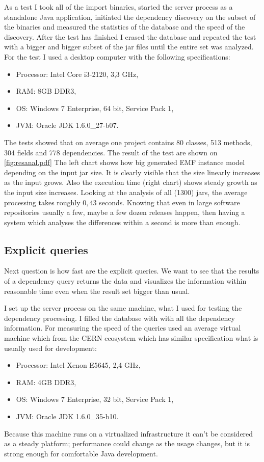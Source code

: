 As a test I took all of the import binaries, started the server process as a
standalone Java application, initiated the dependency discovery on the subset of
the binaries and measured the statistics of the database and the speed of the
discovery. After the test has finished I erased the database and repeated the
test with a bigger and bigger subset of the jar files until the entire set was
analyzed. For the test I used a desktop computer with the following
specifications:
\begin{itemize}
  \item Processor: Intel Core i3-2120, 3,3 GHz,
  \item RAM: 8GB DDR3,
  \item OS: Windows 7 Enterprise, 64 bit, Service Pack 1,
  \item JVM: Oracle JDK 1.6.0\_27-b07.
\end{itemize}
The tests showed that on average one project contains 80 classes, 513 methods, 304 fields and 778 dependencies. 
The result of the test are shown on \autoref{fig:resanal.pdf}
The left chart shows how big generated EMF instance model depending on the
input jar size. It is clearly visible that the size linearly increases
as the input grows. Also the execution time (right chart) shows 
steady growth as the input size increases. Looking at the analysis
 of all (1300) jars, the average processing takes roughly $0,43$ seconds.
Knowing that even in large software repositories usually a few, maybe a few 
dozen releases happen, then having a system which analyses the differences within
a second is more than enough.

\subsection{Explicit queries}
\label{sect:explqueries}
Next question is how fast are the explicit queries. We want to see that the
results of a dependency query returns the data and visualizes the information
within reasonable time even when the result set bigger than usual. 

I set up the server process on the same machine, what I used for 
testing the dependency processing. I filled the database with with all the
dependency information. For measuring the speed of the queries used an average
virtual machine which from the CERN ecosystem which has similar specification
what is usually used for development:
\begin{itemize}
  \item Processor: Intel Xenon E5645, 2,4 GHz,
  \item RAM: 4GB DDR3,
  \item OS: Windows 7 Enterprise, 32 bit, Service Pack 1,
  \item JVM: Oracle JDK 1.6.0\_35-b10.
\end{itemize}
Because this machine runs on a virtualized infrastructure it can't be
considered as a steady platform; performance could change as the usage changes,
but it is strong enough for comfortable Java development. 

